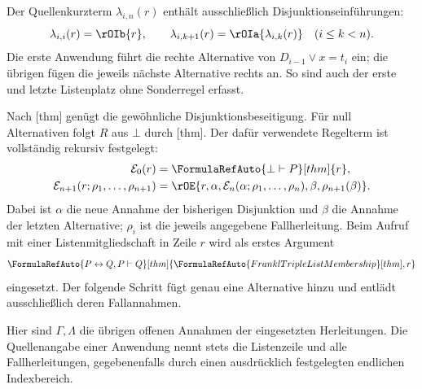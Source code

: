 Der Quellenkurzterm \(\lambda_{i,n}(r)\) enthält ausschließlich
Disjunktionseinführungen:
\[
  \lambda_{i,i}(r)=\rOIb{r},\qquad
  \lambda_{i,k+1}(r)=\rOIa{\lambda_{i,k}(r)}\quad(i\leq k<n).
\]
Die erste Anwendung führt die rechte Alternative von
\(D_{i-1}\lor x=t_i\) ein; die übrigen fügen die jeweils nächste
Alternative rechts an. So sind auch der erste und letzte Listenplatz
ohne Sonderregel erfasst.
\begin{tabproofwide}
\end{tabproofwide}

Nach [thm] genügt die
gewöhnliche Disjunktionsbeseitigung. Für null Alternativen folgt
\(R\) aus \(\bot\) durch [thm].
Der dafür verwendete Regelterm ist vollständig rekursiv festgelegt:
\[
\begin{aligned}
 \mathcal E_0(r)&=\FormulaRefAuto{\bot\vdash P}[thm]{r},\\
 \mathcal E_{n+1}(r;\rho_1,\ldots,\rho_{n+1})
   &=\rOE{r,\alpha,\mathcal E_n(\alpha;\rho_1,\ldots,\rho_n),
       \beta,\rho_{n+1}(\beta)}.
\end{aligned}
\]
Dabei ist \(\alpha\) die neue Annahme der bisherigen Disjunktion und
\(\beta\) die Annahme der letzten Alternative; \(\rho_i\) ist die
jeweils angegebene Fallherleitung. Beim Aufruf mit einer
Listenmitgliedschaft in Zeile \(r\) wird als erstes Argument
\[
 \FormulaRefAuto{P\leftrightarrow Q,P\vdash Q}[thm]
   {\FormulaRefAuto{FranklTripleListMembership}[thm],r}
\]
eingesetzt. Der folgende Schritt fügt genau eine
Alternative hinzu und entlädt ausschließlich deren Fallannahmen.
\begin{tabproofwide}
\end{tabproofwide}
Hier sind \(\Gamma,\Lambda\) die übrigen offenen Annahmen der
eingesetzten Herleitungen. Die Quellenangabe einer Anwendung nennt
stets die Listenzeile und alle Fallherleitungen, gegebenenfalls durch
einen ausdrücklich festgelegten endlichen Indexbereich.

